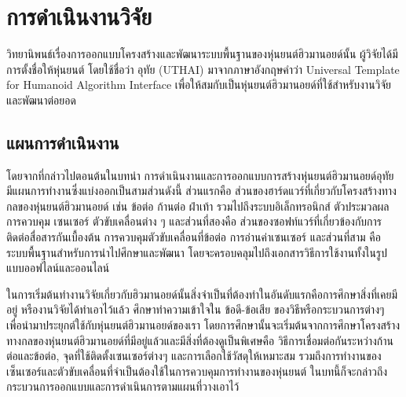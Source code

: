 \chapter{การดำเนินงานวิจัย}
วิทยานิพนธ์เรื่องการออกแบบโครงสร้างและพัฒนาระบบพื้นฐานของหุ่นยนต์ฮิวมานอยด์นั้น ผู้วิจัยได้มีการตั้งชื่อให้หุ่นยนต์
โดยใช้ชื่อว่า อุทัย (UTHAI) มาจากภาษาอังกฤษคำว่า Universal Template for Humanoid Algorithm Interface
เพื่อให้สมกับเป็นหุ่นยนต์ฮิวมานอยด์ที่ใช้สำหรับงานวิจัยและพัฒนาต่อยอด

\section{แผนการดำเนินงาน}
โดยจากที่กล่าวไปตอนต้นในบทนำ
การดำเนินงานและการออกแบบการสร้างหุ่นยนต์ฮิวมานอยด์อุทัย มีแผนการทำงานซึ่งแบ่งออกเป็นสามส่วนดังนี้
ส่วนแรกคือ ส่วนของฮาร์ดแวร์ที่เกี่ยวกับโครงสร้างทางกลของหุ่นยนต์ฮิวมานอยด์ เช่น ข้อต่อ ก้านต่อ ฝ่าเท้า
รวมไปถึงระบบอิเล็กทรอนิกส์ ตัวประมวลผลการควบคุม เซนเซอร์ ตัวขับเคลื่อนต่าง ๆ และส่วนที่สองคือ
ส่วนของซอฟท์แวร์ที่เกี่ยวข้องกับการติดต่อสื่อสารกันเบื้องต้น การควบคุมตัวขับเคลื่อนที่ข้อต่อ การอ่านค่าเซนเซอร์
และส่วนที่สาม คือระบบพื้นฐานสำหรับการนำไปศึกษาและพัฒนา โดยจะครอบคลุมไปถึงเอกสารวิธีการใช้งานทั้งในรูปแบบออฟไลน์และออนไลน์

ในการเริ่มต้นทำงานวิจัยเกี่ยวกับฮิวมานอยด์นั้นสิ่งจำเป็นที่ต้องทำในอันดับแรกคือการศึกษาสิ่งที่เคยมีอยู่ หรืองานวิจัยได้ทำเอาไว้แล้ว
ศึกษาทำความเข้าใจใน ข้อดี-ข้อเสีย ของวิธีหรือกระบวนการต่างๆ เพื่อนำมาประยุกต์ใช้กับหุ่นยนต์ฮิวมานอยด์ของเรา
โดยการศึกษานั้นจะเริ่มต้นจากการศึกษาโครงสร้างทางกลของหุ่นยนต์ฮิวมานอยด์ที่มีอยู่แล้วและมีสิ่งที่ต้องดูเป็นพิเศษคือ
วิธีการเชื่อมต่อกันระหว่างก้านต่อและข้อต่อ, จุดที่ใช้ติดตั้งเซนเซอร์ต่างๆ และการเลือกใช้วัสดุให้เหมาะสม
รวมถึงการทำงานของเซ็นเซอร์และตัวขับเคลื่อนที่จำเป็นต้องใช้ในการควบคุมการทำงานของหุ่นยนต์
ในบทนี้ก็จะกล่าวถึงกระบวนการออกแบบและการดำเนินการตามแผนที่วางเอาไว้




